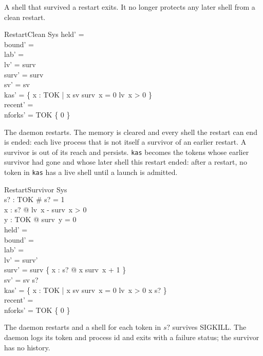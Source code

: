 \documentclass[a4paper,10pt,fleqn]{article}
\begin{document}
A shell that survived a restart exits. It no longer protects any later shell from a clean restart.

\begin{schema}{RestartClean}
  \Delta Sys
\where
  held' = \emptyset \\
  bound' = \emptyset \\
  lab' = \emptyset \\
  lv' = surv \\
  surv' = surv \\
  sv' = sv \\
  kas' = \{ x : TOK | x \in sv \land surv~x = 0 \land lv~x > 0 \} \\
  recent' = \langle \rangle \\
  nforks' = TOK \cross \{ 0 \}
\end{schema}

The daemon restarts. The memory is cleared and every shell the restart can end is ended: each live process that is not itself a survivor of an earlier restart. A survivor is out of its reach and persists. \texttt{kas} becomes the tokens whose earlier survivor had gone and whose later shell this restart ended: after a restart, no token in \texttt{kas} has a live shell until a launch is admitted.

\begin{schema}{RestartSurvivor}
  \Delta Sys \\
  s? : \power TOK
\where
  \# s? = 1 \\
  \forall x : s? @ lv~x - surv~x > 0 \\
  \forall y : TOK @ surv~y = 0 \\
  held' = \emptyset \\
  bound' = \emptyset \\
  lab' = \emptyset \\
  lv' = surv' \\
  surv' = surv \oplus \{ x : s? @ x \mapsto surv~x + 1 \} \\
  sv' = sv \cup s? \\
  kas' = \{ x : TOK | x \in sv \land surv~x = 0 \land lv~x > 0 \land x \notin s? \} \\
  recent' = \langle \rangle \\
  nforks' = TOK \cross \{ 0 \}
\end{schema}

The daemon restarts and a shell for each token in $s?$ survives SIGKILL. The daemon logs its token and process id and exits with a failure status; the survivor has no history.
\end{document}
